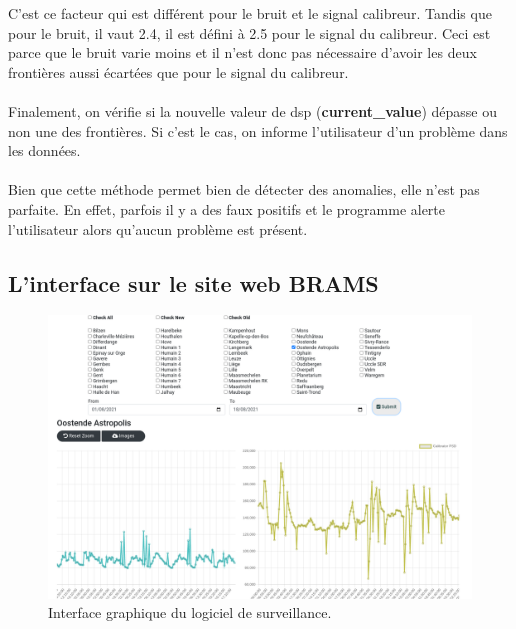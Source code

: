 \documentclass[11pt]{article}
\begin{document}
C'est ce facteur qui est différent pour le bruit et le signal calibreur.
Tandis que pour le bruit, il vaut 2.4, il est défini à  2.5 pour le signal du calibreur.
Ceci est parce que le bruit varie moins et il n'est donc pas nécessaire d'avoir les deux frontières aussi écartées que pour le signal du calibreur.\\
\\
Finalement, on vérifie si la nouvelle valeur de dsp (\textbf{current\_value}) dépasse ou non une des frontières.
Si c'est le cas, on informe l'utilisateur d'un problème dans les données.\\
\\
Bien que cette méthode permet bien de détecter des anomalies, elle n'est pas parfaite.
En effet, parfois il y a des faux positifs et le programme alerte l'utilisateur alors qu'aucun problème est présent.

\subsection{L'interface sur le site web BRAMS}

\begin{figure}[t]
    \begin{center}
        \includegraphics[scale=0.22]{monitoring_ui.png}
        \caption{Interface graphique du logiciel de surveillance.}
        \label{fig:monitoring-ui}
    \end{center}
\end{figure}
\end{document}
